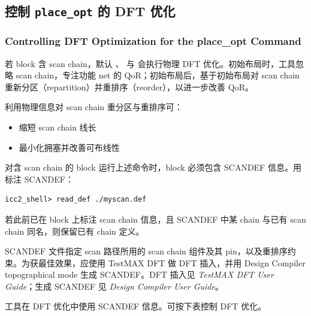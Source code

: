 \subsection{控制 \texttt{place\_opt} 的 DFT 优化}
\subsubsection*{Controlling DFT Optimization for the place\_opt Command}

若 block 含 scan chain，默认 、 与  会执行物理 DFT 优化。初始布局时，工具忽略 scan chain，专注功能 net 的 QoR；初始布局后，基于初始布局对 scan chain 重新分区（repartition）并重排序（reorder），以进一步改善 QoR。

利用物理信息对 scan chain 重分区与重排序可：
\begin{itemize}
  \item 缩短 scan chain 线长
  \item 最小化拥塞并改善可布线性
\end{itemize}

对含 scan chain 的 block 运行上述命令时，block 必须包含 SCANDEF 信息。用  标注 SCANDEF：
\begin{lstlisting}
icc2_shell> read_def ./myscan.def
\end{lstlisting}

\begin{noteBox}
若此前已在 block 上标注 scan chain 信息，且 SCANDEF 中某 chain 与已有 scan chain 同名，则保留已有 chain 定义。
\end{noteBox}

SCANDEF 文件指定 scan 路径所用的 scan chain 组件及其 pin，以及重排序约束。为获最佳效果，应使用 TestMAX DFT 做 DFT 插入，并用 Design Compiler topographical mode 生成 SCANDEF。DFT 插入见 \textit{TestMAX DFT User Guide}；生成 SCANDEF 见 \textit{Design Compiler User Guide}。

工具在 DFT 优化中使用 SCANDEF 信息。可按下表控制 DFT 优化。

